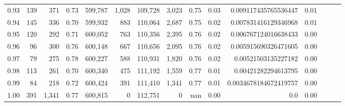 \begin{tabular}{rrrrrrrrrrrrrrr}
0.93 &     139 &    371 &  0.73 &  599,787 &    1,028 &  109,728 &    3,023 &  0.75 &  0.03 &   0.009117435765536447 &      0.01 \\
0.94 &     145 &    336 &  0.70 &  599,932 &      883 &  110,064 &    2,687 &  0.75 &  0.02 &   0.007831416129346968 &      0.01 \\
0.95 &     120 &    292 &  0.71 &  600,052 &      763 &  110,356 &    2,395 &  0.76 &  0.02 &   0.006767124016638433 &      0.00 \\
0.96 &      96 &    300 &  0.76 &  600,148 &      667 &  110,656 &    2,095 &  0.76 &  0.02 &   0.005915690326471605 &      0.00 \\
0.97 &      79 &    275 &  0.78 &  600,227 &      588 &  110,931 &    1,820 &  0.76 &  0.02 &    0.00521503135227182 &      0.00 \\
0.98 &     113 &    261 &  0.70 &  600,340 &      475 &  111,192 &    1,559 &  0.77 &  0.01 &    0.00421282294613795 &      0.00 \\
0.99 &      84 &    218 &  0.72 &  600,424 &      391 &  111,410 &    1,341 &  0.77 &  0.01 &  0.0034678184672419757 &      0.00 \\
1.00 &     391 &  1,341 &  0.77 &  600,815 &        0 &  112,751 &        0 &   nan &  0.00 &                    0.0 &      0.00 \\
\bottomrule
\end{tabular}
